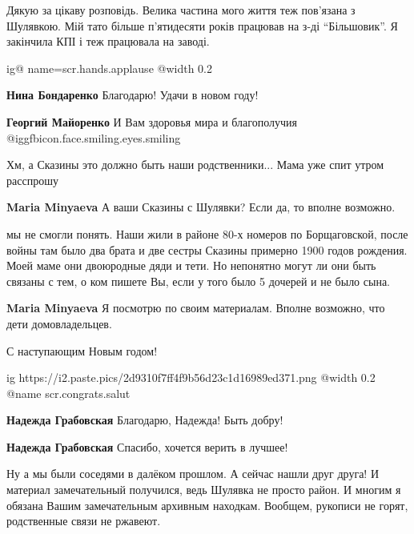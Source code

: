 \begin{itemize}
Дякую за цікаву розповідь. Велика частина мого життя теж пов'язана з Шулявкою.
Мій тато більше п'ятидесяти років працював на з-ді \enquote{Більшовик}. Я закінчила КПІ
і теж працювала на заводі.

\ifcmt
  ig@ name=scr.hands.applause
  @width 0.2
\fi

\begin{itemize} %
\textbf{Нина Бондаренко} Благодарю! Удачи в новом году!

\textbf{Георгий Майоренко} И Вам здоровья мира и благополучия  @igg{fbicon.face.smiling.eyes.smiling} 
\end{itemize} %

Хм, а Сказины это должно быть наши родственники... Мама уже спит утром расспрошу

\begin{itemize} %
\textbf{Maria Minyaeva} А ваши Сказины с Шулявки? Если да, то вполне возможно.


мы не смогли понять. Наши жили в районе 80-х номеров по Борщаговской, после
войны там было два брата и две сестры Сказины примерно 1900 годов рождения.
Моей маме они двоюродные дяди и тети. Но непонятно могут ли они быть связаны с
тем, о ком пишете Вы, если у того было 5 дочерей и не было сына.

\textbf{Maria Minyaeva} Я посмотрю по своим материалам. Вполне возможно, что дети домовладельцев.
\end{itemize} %

С наступающим Новым годом!

\ifcmt
  ig https://i2.paste.pics/2d9310f7ff4f9b56d23c1d16989ed371.png
  @width 0.2
	@name scr.congrats.salut
\fi

\begin{itemize} %
\textbf{Надежда Грабовская} Благодарю, Надежда! Быть добру!

\textbf{Надежда Грабовская} Спасибо, хочется верить в лучшее!
\end{itemize} %


Ну а мы были соседями в далёком прошлом. А сейчас нашли друг друга! И материал
замечательный получился, ведь Шулявка не просто район. И многим я обязана Вашим
замечательным архивным находкам. Вообщем, рукописи не горят, родственные связи
не ржавеют.


\end{itemize}
